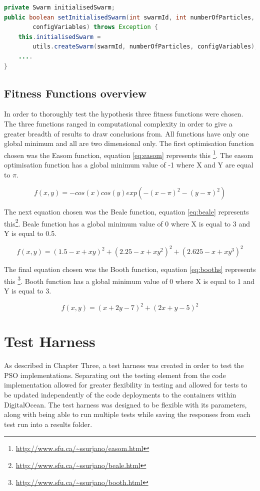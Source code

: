 \documentclass[oneside,12pt]{book}
\begin{document}
\begin{lstlisting}[basicstyle=\footnotesize, language=Java]
private Swarm initialisedSwarm;
public boolean setInitialisedSwarm(int swarmId, int numberOfParticles, ConfigVariables         
        configVariables) throws Exception {
    this.initialisedSwarm = 
        utils.createSwarm(swarmId, numberOfParticles, configVariables);
    ....
}
\end{lstlisting}
\label{listing:Distributedinitialisation}

\subsection{Fitness Functions overview}
In order to thoroughly test the hypothesis three fitness functions were chosen. The three functions ranged in computational complexity in order to give a greater breadth of results to draw conclusions from. All functions have only one global minimum and all are two dimensional only. The first optimisation function chosen was the Easom function, equation \ref{eq:easom} represents this \footnote{\url{http://www.sfu.ca/~ssurjano/easom.html}}. The easom optimisation function has a global minimum value of -1 where X and Y are equal to $\pi$. 

\begin{equation}\label{eq:easom}
f(x,y)=-cos(x)cos(y)exp(-(x-\pi)^2-(y-\pi)^2)
\end{equation}

The next equation chosen was the Beale function, equation \ref{eq:beale} represents this\footnote{\url{http://www.sfu.ca/~ssurjano/beale.html}}. Beale function has a global minimum value of 0 where X is equal to 3 and Y is equal to 0.5. 

\begin{equation}\label{eq:beale}
f(x, y) = (1.5-x+xy)^2+(2.25-x+xy^2)^2+(2.625-x+xy^3)^2
\end{equation}

The final equation chosen was the Booth function, equation \ref{eq:booths} represents this \footnote{\url{http://www.sfu.ca/~ssurjano/booth.html}}. Booth function has a global minimum value of 0 where X is equal to 1 and Y is equal to 3. 

\begin{equation}\label{eq:booths}
f(x,y)=(x+2y-7)^2+(2x+y-5)^2
\end{equation}


\section{Test Harness}
As described in Chapter Three, a test harness was created in order to test the PSO implementations. Separating out the testing element from the code implementation allowed for greater flexibility in testing and allowed for tests to be updated independently of the code deployments to the containers within DigitalOcean. The test harness was designed to be flexible with its parameters, along with being able to run multiple tests while saving the responses from each test run into a results folder.
\end{document}
